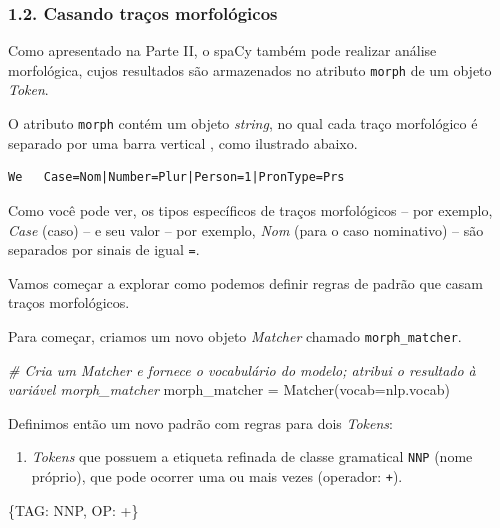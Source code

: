 \documentclass[
  brazilian,
]{article}
\newenvironment{Shaded}{}{}
\newcommand{\CommentTok}[1]{\textcolor[rgb]{0.38,0.63,0.69}{\textit{#1}}}
\newcommand{\NormalTok}[1]{#1}
\newcommand{\OperatorTok}[1]{\textcolor[rgb]{0.40,0.40,0.40}{#1}}
\newcommand{\StringTok}[1]{\textcolor[rgb]{0.25,0.44,0.63}{#1}}
\providecommand{\tightlist}{%
  \setlength{\itemsep}{0pt}\setlength{\parskip}{0pt}}
\begin{document}
\hypertarget{casando-trauxe7os-morfoluxf3gicos}{%
\subsubsection{1.2. Casando traços
morfológicos}\label{casando-trauxe7os-morfoluxf3gicos}}

Como apresentado na Parte II, o spaCy também pode realizar análise
morfológica, cujos resultados são armazenados no atributo \texttt{morph}
de um objeto \emph{Token}.

O atributo \texttt{morph} contém um objeto \emph{string}, no qual cada
traço morfológico é separado por uma barra vertical \texttt{\textbar{}},
como ilustrado abaixo.

\begin{verbatim}
We   Case=Nom|Number=Plur|Person=1|PronType=Prs
\end{verbatim}

Como você pode ver, os tipos específicos de traços morfológicos -- por
exemplo, \emph{Case} (caso) -- e seu valor -- por exemplo, \emph{Nom}
(para o caso nominativo) -- são separados por sinais de igual
\texttt{=}.

Vamos começar a explorar como podemos definir regras de padrão que casam
traços morfológicos.

Para começar, criamos um novo objeto \emph{Matcher} chamado
\texttt{morph\_matcher}.

\begin{Shaded}
\begin{Highlighting}[]
\CommentTok{\# Cria um Matcher e fornece o vocabulário do modelo; atribui o resultado à variável \textquotesingle{}morph\_matcher\textquotesingle{}}
\NormalTok{morph\_matcher }\OperatorTok{=}\NormalTok{ Matcher(vocab}\OperatorTok{=}\NormalTok{nlp.vocab)}
\end{Highlighting}
\end{Shaded}

Definimos então um novo padrão com regras para dois \emph{Tokens}:

\begin{enumerate}
\def\labelenumi{\arabic{enumi}.}
\tightlist
\item
  \emph{Tokens} que possuem a etiqueta refinada de classe gramatical
  \texttt{NNP} (nome próprio), que pode ocorrer uma ou mais vezes
  (operador: \texttt{+}).
\end{enumerate}

\begin{Shaded}
\begin{Highlighting}[]
\NormalTok{\{}\StringTok{\textquotesingle{}TAG\textquotesingle{}}\NormalTok{: }\StringTok{\textquotesingle{}NNP\textquotesingle{}}\NormalTok{, }\StringTok{\textquotesingle{}OP\textquotesingle{}}\NormalTok{: }\StringTok{\textquotesingle{}+\textquotesingle{}}\NormalTok{\}}
\end{Highlighting}
\end{Shaded}
\end{document}
